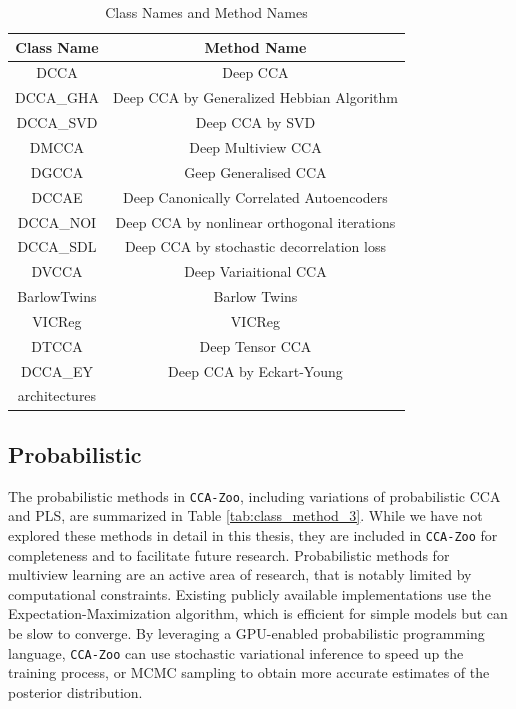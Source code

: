 \begin{table}[ht]
    \centering
    \begin{tabular}{|c|c|}
        \hline
        Class Name & Method Name \\
        \hline
        DCCA & Deep CCA \\
        DCCA\_GHA & Deep CCA by Generalized Hebbian Algorithm \\
        DCCA\_SVD & Deep CCA by SVD \\
        DMCCA & Deep Multiview CCA \\
        DGCCA & Geep Generalised CCA \\
        DCCAE & Deep Canonically Correlated Autoencoders \\
        DCCA\_NOI & Deep CCA by nonlinear orthogonal iterations \\
        DCCA\_SDL & Deep CCA by stochastic decorrelation loss \\
        DVCCA & Deep Variaitional CCA \\
        BarlowTwins & Barlow Twins \\
        VICReg & VICReg \\
        DTCCA & Deep Tensor CCA \\
        DCCA\_EY & Deep CCA by Eckart-Young \\
        architectures & \\
        \hline
    \end{tabular}
    \caption{Class Names and Method Names}\label{tab:class_method_2}
\end{table}

\subsection{Probabilistic}
The probabilistic methods in \texttt{CCA-Zoo}, including variations of probabilistic CCA and PLS, are summarized in Table \ref{tab:class_method_3}.
While we have not explored these methods in detail in this thesis, they are included in \texttt{CCA-Zoo} for completeness and to facilitate future research.
Probabilistic methods for multiview learning are an active area of research, that is notably limited by computational constraints.
Existing publicly available implementations use the Expectation-Maximization algorithm, which is efficient for simple models but can be slow to converge.
By leveraging a GPU-enabled probabilistic programming language, \texttt{CCA-Zoo} can use stochastic variational inference to speed up the training process, or MCMC sampling to obtain more accurate estimates of the posterior distribution.

